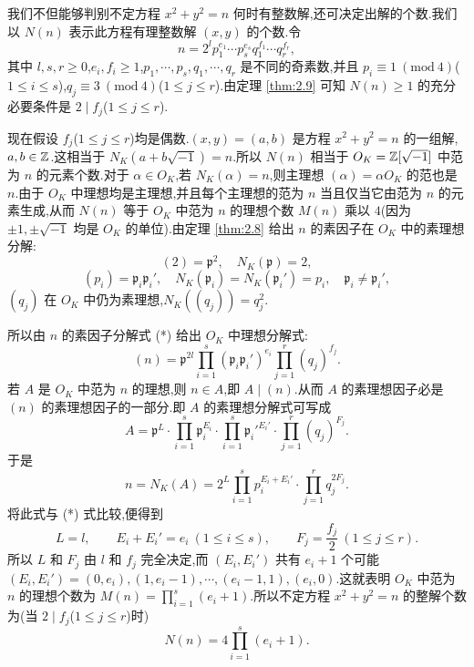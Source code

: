\begin{remark}
我们不但能够判别不定方程 $x^2+y^2=n$ 何时有整数解,还可决定出解的个数.我们以 $N(n)$ 表示此方程有理整数解 $(x,y)$ 的个数.令
\begin{equation}  n=2^{l}p_1^{e_1}\cdots p_s^{e_s}q_1^{f_1}\cdots q_r^{f_r},\tag{*}\end{equation}
其中 $l,s,r\geqslant 0$,$e_i,f_i\geqslant 1$,$p_1,\cdots,p_s,q_1,\cdots,q_r$ 是不同的奇素数,并且 $p_i\equiv 1\ (\mathrm{mod}\ 4)$($1\leqslant i\leqslant s$),$q_j\equiv 3\ (\mathrm{mod}\ 4)$($1\leqslant j\leqslant r$).由定理 \ref{thm:2.9} 可知 $N(n)\geqslant 1$ 的充分必要条件是 $2\mid f_j$($1\leqslant j\leqslant r$).

现在假设 $f_j$($1\leqslant j\leqslant r$)均是偶数.$(x,y)=(a,b)$ 是方程 $x^2+y^2=n$ 的一组解,$a,b\in\mathbb{Z}$.这相当于 $N_K(a+b\sqrt{-1})=n$.所以 $N(n)$ 相当于 $O_K=\mathbb{Z}[\sqrt{-1}]$ 中范为 $n$ 的元素个数.对于 $\alpha\in O_K$,若 $N_K(\alpha)=n$,则主理想 $(\alpha)=\alpha O_K$ 的范也是 $n$.由于 $O_K$ 中理想均是主理想,并且每个主理想的范为 $n$ 当且仅当它由范为 $n$ 的元素生成,从而 $N(n)$ 等于 $O_K$ 中范为 $n$ 的理想个数 $M(n)$ 乘以 $4$(因为 $\pm 1,\pm\sqrt{-1}$ 均是 $O_K$ 的单位).由定理 \ref{thm:2.8} 给出 $n$ 的素因子在 $O_K$ 中的素理想分解:
\[
  (2)=\mathfrak{p}^2,\quad N_K(\mathfrak{p})=2,
\]
\[
  (p_i)=\mathfrak{p}_i\mathfrak{p}_i',\quad
  N_K(\mathfrak{p}_i)=N_K(\mathfrak{p}_i')=p_i,\quad \mathfrak{p}_i\neq\mathfrak{p}_i',
\]
$(q_j)$ 在 $O_K$ 中仍为素理想,$N_K((q_j))=q_j^2$.

所以由 $n$ 的素因子分解式 (*) 给出 $O_K$ 中理想分解式:
\[
  (n)=\mathfrak{p}^{2l}\prod_{i=1}^{s}(\mathfrak{p}_i\mathfrak{p}_i')^{e_i}\prod_{j=1}^{r}(q_j)^{f_j}.
\]
若 $A$ 是 $O_K$ 中范为 $n$ 的理想,则 $n\in A$,即 $A\mid(n)$.从而 $A$ 的素理想因子必是 $(n)$ 的素理想因子的一部分.即 $A$ 的素理想分解式可写成
\[
  A=\mathfrak{p}^{L}\cdot\prod_{i=1}^{s}\mathfrak{p}_i^{E_i}\cdot\prod_{i=1}^{s}\mathfrak{p}_i'^{E_i'}\cdot\prod_{j=1}^{r}(q_j)^{F_j}.
\]
于是
\[
  n=N_K(A)=2^{L}\prod_{i=1}^{s}p_i^{E_i+E_i'}\cdot\prod_{j=1}^{r}q_j^{2F_j}.
\]
将此式与 (*) 式比较,便得到
\[
  L=l,\qquad E_i+E_i'=e_i\ (1\leqslant i\leqslant s),\qquad F_j=\frac{f_j}{2}\ (1\leqslant j\leqslant r).
\]
所以 $L$ 和 $F_j$ 由 $l$ 和 $f_j$ 完全决定,而 $(E_i,E_i')$ 共有 $e_i+1$ 个可能 $(E_i,E_i')=(0,e_i),(1,e_i-1),\cdots,(e_i-1,1),(e_i,0)$.这就表明 $O_K$ 中范为 $n$ 的理想个数为 $M(n)=\prod_{i=1}^{s}(e_i+1)$.所以不定方程 $x^2+y^2=n$ 的整解个数为(当 $2\mid f_j$($1\leqslant j\leqslant r$)时)
\[
  N(n)=4\prod_{i=1}^{s}(e_i+1).
\]
\end{remark}

